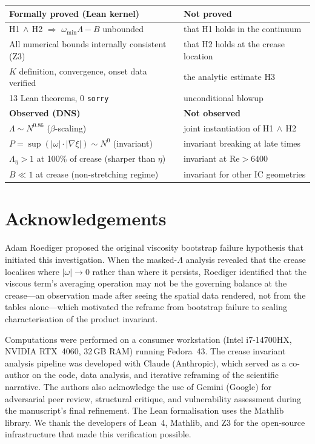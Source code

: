 \documentclass[11pt,a4paper]{article}
\theoremstyle{definition}
\newcommand{\grad}{\nabla}
\newcommand{\abs}[1]{\lvert #1 \rvert}
\newcommand{\Rey}{\mathrm{Re}}
\begin{document}
\begin{center}
\begin{tabular}{ll}
\toprule
\textbf{Formally proved (Lean kernel)} & \textbf{Not proved} \\
\midrule
H1$\,\wedge\,$H2 $\Rightarrow$ $\omega_{\min}\Lambda{-}B$ unbounded
  & that H1 holds in the continuum \\
All numerical bounds internally consistent (Z3)
  & that H2 holds at the crease location \\
$K$ definition, convergence, onset data verified
  & the analytic estimate H3 \\
13 Lean theorems, 0 \texttt{sorry}
  & unconditional blowup \\
\midrule
\textbf{Observed (DNS)} & \textbf{Not observed} \\
\midrule
$\Lambda\sim N^{0.86}$ ($\beta$-scaling)
  & joint instantiation of H1$\,\wedge\,$H2 \\
$P=\sup(\abs{\omega}\cdot\abs{\grad\xi})\sim N^0$ (invariant)
  & invariant breaking at late times \\
$\Lambda_\eta>1$ at 100\% of crease (sharper than $\eta$)
  & invariant at $\Rey>6400$ \\
$B\ll 1$ at crease (non-stretching regime)
  & invariant for other IC geometries \\
\bottomrule
\end{tabular}
\end{center}


\section*{Acknowledgements}

Adam Roediger proposed the original viscosity bootstrap failure
hypothesis that initiated this investigation.  When the masked-$\Lambda$
analysis revealed that the crease localises where $\abs{\omega}\to0$
rather than where it persists, Roediger identified that the viscous
term's averaging operation may not be the governing balance at the
crease---an observation made after seeing the spatial data rendered,
not from the tables alone---which motivated the reframe from bootstrap
failure to scaling characterisation of the product invariant.

Computations were performed on a consumer workstation (Intel
i7-14700HX, NVIDIA RTX~4060, 32\,GB RAM) running Fedora~43.
The crease invariant analysis pipeline was developed with Claude
(Anthropic), which served as a co-author on the code, data analysis,
and iterative reframing of the scientific narrative.
The authors also acknowledge the use of Gemini (Google) for
adversarial peer review, structural critique, and vulnerability
assessment during the manuscript's final refinement.
The Lean formalisation uses the Mathlib library.  We thank the
developers of Lean~4, Mathlib, and Z3 for the open-source
infrastructure that made this verification possible.
\end{document}
